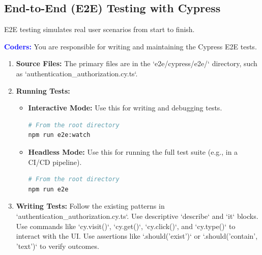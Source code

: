 \documentclass{article}
\newcommand{\role}[1]{\textbf{\textcolor{blue}{#1:}}}
\begin{document}
\subsection{End-to-End (E2E) Testing with Cypress}
E2E testing simulates real user scenarios from start to finish.

\role{Coders}
You are responsible for writing and maintaining the Cypress E2E tests.
\begin{enumerate}
    \item \textbf{Source Files:} The primary files are in the `e2e/cypress/e2e/` directory, such as `authentication\_authorization.cy.ts`.
    \item \textbf{Running Tests:}
    \begin{itemize}
        \item \textbf{Interactive Mode:} Use this for writing and debugging tests.
        \begin{lstlisting}[language=bash]
# From the root directory
npm run e2e:watch
        \end{lstlisting}
        \item \textbf{Headless Mode:} Use this for running the full test suite (e.g., in a CI/CD pipeline).
        \begin{lstlisting}[language=bash]
# From the root directory
npm run e2e
        \end{lstlisting}
    \end{itemize}
    \item \textbf{Writing Tests:} Follow the existing patterns in `authentication\_authorization.cy.ts`. Use descriptive `describe` and `it` blocks. Use commands like `cy.visit()`, `cy.get()`, `cy.click()`, and `cy.type()` to interact with the UI. Use assertions like `.should('exist')` or `.should('contain', 'text')` to verify outcomes.
\end{enumerate}
\end{document}
